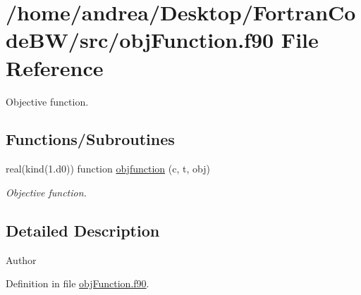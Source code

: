 \hypertarget{obj_function_8f90}{\section{/home/andrea/\-Desktop/\-Fortran\-Code\-B\-W/src/obj\-Function.f90 File Reference}
\label{obj_function_8f90}
}


Objective function.  


\subsection*{Functions/\-Subroutines}
\begin{DoxyCompactItemize}
\item 
real(kind(1.d0)) function \hyperlink{obj_function_8f90_a0ff9fc399d164c2a4d02766246f4ba8e}{objfunction} (c, t, obj)
\begin{DoxyCompactList}\small\item\em Objective function. \end{DoxyCompactList}\end{DoxyCompactItemize}


\subsection{Detailed Description}
\begin{DoxyAuthor}{Author}

\end{DoxyAuthor}


Definition in file \hyperlink{obj_function_8f90_source}{obj\-Function.\-f90}.



